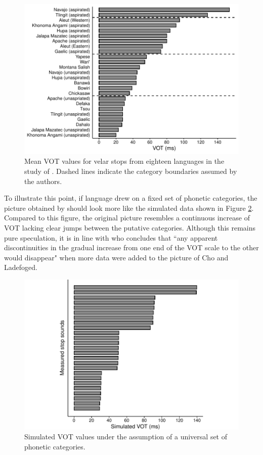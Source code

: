 \begin{figure}
\includegraphics[width=\linewidth]{figures/ch2/real_vot.pdf}
\caption[Mean VOT values for velar stops from eighteen languages in the study of \cite{ChoLadefoged1999}]{Mean VOT values for velar stops from eighteen languages in the study of \cite{ChoLadefoged1999}. Dashed lines indicate the category boundaries assumed by the authors.}
\label{fig:cho_ladefoged_1999}
\end{figure}

To illustrate this point, if language drew on a fixed set of phonetic categories, the picture obtained by \cite{ChoLadefoged1999} should look more like the simulated data shown in Figure \ref{fig:simulated_vot}. Compared to this figure, the original picture resembles a continuous increase of VOT lacking clear jumps between the putative categories. Although this remains pure speculation, it is in line with \citet[42]{Ladd2014} who concludes that ``any apparent discontinuities in the gradual increase from one end of the VOT scale to the other would disappear" when more data were added to the picture of Cho and Ladefoged.

\begin{figure}
\includegraphics[width=\linewidth]{figures/ch2/simulated_vot.pdf}
\caption{Simulated VOT values under the assumption of a universal set of phonetic categories.}
\label{fig:simulated_vot}
\end{figure}

